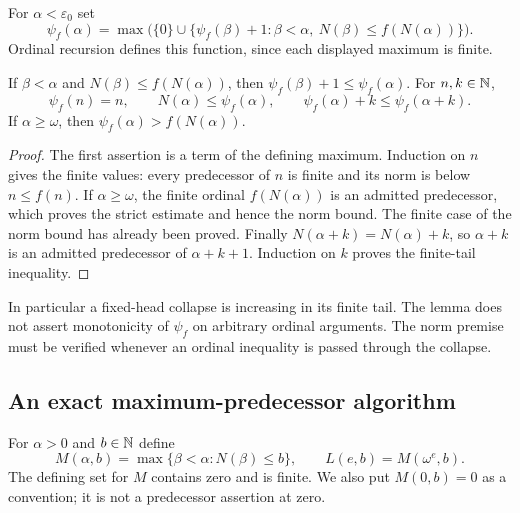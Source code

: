 \begin{definition}\label{def:collapse}
For $\alpha<\varepsilon_0$ set
\[
 \psi_f(\alpha)=\max\bigl(\{0\}\cup
   \{\psi_f(\beta)+1:\beta<\alpha,
                    \ N(\beta)\le f(N(\alpha))\}\bigr).
\]
Ordinal recursion defines this function, since each displayed maximum
is finite.
\end{definition}

\begin{lemma}\label{lem:collapse-estimates}
If $\beta<\alpha$ and $N(\beta)\le f(N(\alpha))$, then
$\psi_f(\beta)+1\le\psi_f(\alpha)$.  For $n,k\in\mathbb N$,
\[
 \psi_f(n)=n,\qquad N(\alpha)\le\psi_f(\alpha),\qquad
 \psi_f(\alpha)+k\le\psi_f(\alpha+k).
\]
If $\alpha\ge\omega$, then $\psi_f(\alpha)>f(N(\alpha))$.
\end{lemma}
\begin{proof}
The first assertion is a term of the defining maximum.  Induction on
$n$ gives the finite values: every predecessor of $n$ is finite and
its norm is below $n\le f(n)$.  If $\alpha\ge\omega$, the finite
ordinal $f(N(\alpha))$ is an admitted predecessor, which proves the
strict estimate and hence the norm bound.  The finite case of the norm
bound has already been proved.  Finally $N(\alpha+k)=N(\alpha)+k$,
so $\alpha+k$ is an admitted predecessor of $\alpha+k+1$.
Induction on $k$ proves the finite-tail inequality.
\end{proof}

In particular a fixed-head collapse is increasing in its finite tail.
The lemma does not assert monotonicity of $\psi_f$ on arbitrary ordinal
arguments.  The norm premise must be verified whenever an ordinal
inequality is passed through the collapse.

\subsection{An exact maximum-predecessor algorithm}

For $\alpha>0$ and $b\in\mathbb N$ define
\[
 M(\alpha,b)=\max\{\beta<\alpha:N(\beta)\le b\},\qquad
 L(e,b)=M(\omega^e,b).
\]
The defining set for $M$ contains zero and is finite.  We also put
$M(0,b)=0$ as a convention; it is not a predecessor assertion at zero.

